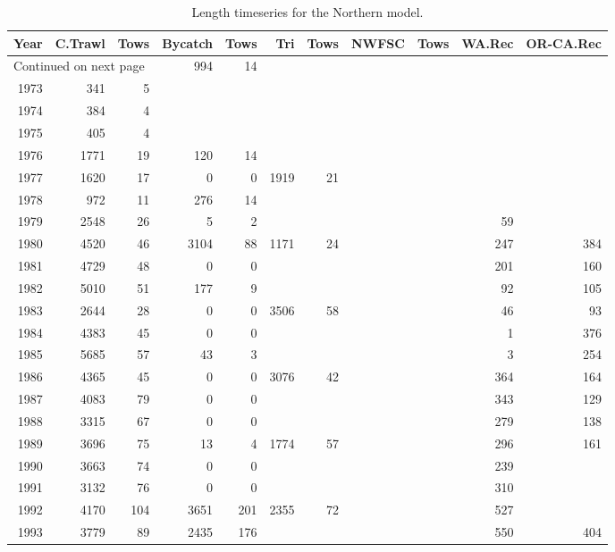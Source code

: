 \documentclass[12pt,]{article}
\begin{document}
\begin{longtable}{rrrrrrrrrrr}
\caption{Length timeseries for the Northern model.} \\ 
  \hline
Year & C.Trawl & Tows & Bycatch & Tows & Tri & Tows & NWFSC & Tows & WA.Rec & OR-CA.Rec \\ 
  \hline 
\endhead 
\hline 
\multicolumn{3}{l}{\footnotesize Continued on next page} 
\endfoot 
\endlastfoot 
 \hline
1972 &  994 &   14 &  &  &  &  &  &  &  &  \\ 
  1973 &  341 &    5 &  &  &  &  &  &  &  &  \\ 
  1974 &  384 &    4 &  &  &  &  &  &  &  &  \\ 
  1975 &  405 &    4 &  &  &  &  &  &  &  &  \\ 
  1976 & 1771 &   19 &  120 &   14 &  &  &  &  &  &  \\ 
  1977 & 1620 &   17 &    0 &    0 & 1919 &   21 &  &  &  &  \\ 
  1978 &  972 &   11 &  276 &   14 &  &  &  &  &  &  \\ 
  1979 & 2548 &   26 &    5 &    2 &  &  &  &  &   59 &  \\ 
  1980 & 4520 &   46 & 3104 &   88 & 1171 &   24 &  &  &  247 &  384 \\ 
  1981 & 4729 &   48 &    0 &    0 &  &  &  &  &  201 &  160 \\ 
  1982 & 5010 &   51 &  177 &    9 &  &  &  &  &   92 &  105 \\ 
  1983 & 2644 &   28 &    0 &    0 & 3506 &   58 &  &  &   46 &   93 \\ 
  1984 & 4383 &   45 &    0 &    0 &  &  &  &  &    1 &  376 \\ 
  1985 & 5685 &   57 &   43 &    3 &  &  &  &  &    3 &  254 \\ 
  1986 & 4365 &   45 &    0 &    0 & 3076 &   42 &  &  &  364 &  164 \\ 
  1987 & 4083 &   79 &    0 &    0 &  &  &  &  &  343 &  129 \\ 
  1988 & 3315 &   67 &    0 &    0 &  &  &  &  &  279 &  138 \\ 
  1989 & 3696 &   75 &   13 &    4 & 1774 &   57 &  &  &  296 &  161 \\ 
  1990 & 3663 &   74 &    0 &    0 &  &  &  &  &  239 &  \\ 
  1991 & 3132 &   76 &    0 &    0 &  &  &  &  &  310 &  \\ 
  1992 & 4170 &  104 & 3651 &  201 & 2355 &   72 &  &  &  527 &  \\ 
  1993 & 3779 &   89 & 2435 &  176 &  &  &  &  &  550 &  404 \\ 

\end{longtable}
\end{document}
